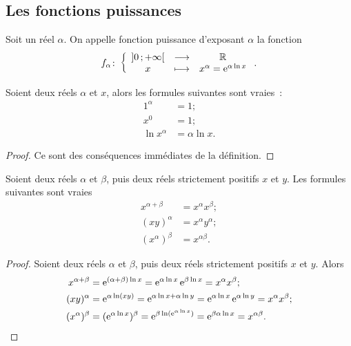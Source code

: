 \subsection{Les fonctions puissances}
\label{subsec:chap1-fonctionspuissances}
\begin{defdef}
    Soit un réel \(\alpha\). On appelle fonction puissance d'exposant 
    \(\alpha\) la fonction
    \begin{equation}
        f_{\alpha}\colon \left\{\begin{array}{ccc} \left] 0 \, ;  +\infty \right[ & \longrightarrow &\mathbb{R}\\ x & \longmapsto & x^{\alpha}=\operatorname{e}^{\alpha \ln 
        x} \end{array} \right..
    \end{equation}
\end{defdef}
\begin{prop}
    Soient deux réels \(\alpha\) et \(x\), alors les formules suivantes sont 
    vraies~:
    \begin{align}
        1^{\alpha}&=1; \\
        x^0&=1; \\
        \ln x^{\alpha} &= \alpha \ln x.
    \end{align}
\end{prop}
\begin{proof}
    Ce sont des conséquences immédiates de la définition.
\end{proof}
\begin{prop}
    Soient deux réels \(\alpha\) et \(\beta\), puis deux réels strictement 
    positifs \(x\) et \(y\). Les formules suivantes sont vraies
    \begin{align}
        x^{\alpha+\beta} &= x^\alpha x^\beta;\\
        (xy)^\alpha &= x^\alpha y^\alpha;\\
        (x^\alpha)^\beta &= x^{\alpha\beta}.
    \end{align}
\end{prop}
\begin{proof}
    Soient deux réels \(\alpha\) et \(\beta\), puis deux réels strictement 
    positifs \(x\) et \(y\). Alors
    \begin{align}
        x^{\alpha+\beta} &=\operatorname{e}^{(\alpha+\beta)\ln x}=\operatorname{e}^{\alpha \ln x} 
        \operatorname{e}^{\beta \ln x}=x^\alpha x^\beta;\\
        (xy)^\alpha &=\operatorname{e}^{\alpha \ln (xy)}=\operatorname{e}^{\alpha \ln x +\alpha \ln 
        y}=\operatorname{e}^{\alpha \ln x} \operatorname{e}^{\alpha \ln y}=x^\alpha x^\beta ;\\
            (x^\alpha)^\beta &=(\operatorname{e}^{\alpha \ln x})^\beta=\operatorname{e}^{\beta 
            \ln(\operatorname{e}^{\alpha \ln x})}=\operatorname{e}^{\beta \alpha \ln x}=x^{\alpha 
        \beta}.
    \end{align}
\end{proof}
